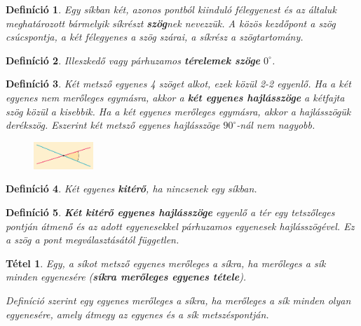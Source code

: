 \documentclass[12pt,a4paper]{article}
\newtheorem{theorem}{Tétel} [section]
\newtheorem{definition}{Definíció} [section]
\begin{document}
\begin{definition}
Egy síkban két, azonos pontból kiinduló félegyenest és az általuk meghatározott bármelyik síkrészt \textbf{szög}nek nevezzük. A közös kezdőpont a {szög} csúcspontja, a két félegyenes a szög szárai, a síkrész a szögtartomány.
\end{definition}

\begin{definition}
Illeszkedő vagy párhuzamos \textbf{térelemek szöge} $0^\circ$.
\end{definition}

\begin{definition}
Két metsző egyenes 4 szöget alkot, ezek közül 2-2 egyenlő. Ha a két egyenes nem merőleges egymásra, akkor a \textbf{két egyenes hajlásszöge} a kétfajta szög közül a kisebbik. Ha a két egyenes merőleges egymásra, akkor a hajlásszögük derékszög. Eszerint két metsző egyenes hajlásszöge $90^\circ$-nál nem nagyobb.
\begin{figure}[h]
\centering
\includegraphics[width=0.2\textwidth]{egyenesek_hajlasszoge}
\end{figure}
\end{definition}

\begin{definition}
Két egyenes \textbf{kitérő}, ha nincsenek egy síkban.
\end{definition}

\begin{definition}
\textbf{Két kitérő egyenes hajlásszöge} egyenlő a tér egy tetszőleges pontján átmenő és az adott egyenesekkel párhuzamos egyenesek hajlásszögével. Ez a szög a pont megválasztásától független.
\end{definition}

\begin{theorem}
Egy, a síkot metsző egyenes merőleges a síkra, ha merőleges a sík minden egyenesére (\textbf{síkra merőleges egyenes tétele}).

Definíció szerint egy egyenes merőleges a síkra, ha merőleges a sík minden olyan egyenesére, amely átmegy az egyenes és a sík metszéspontján.
\end{theorem}
\end{document}
